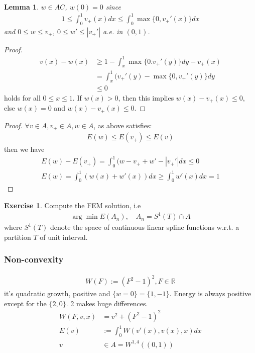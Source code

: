 \documentclass[a4paper,12pt,oneside,fleqn]{book}
\newtheorem{lemma}[theorem]{Lemma}
\theoremstyle{definition}
\newtheorem{exercise}{Exercise}[chapter]
\theoremstyle{remark}
\begin{document}
\quad\\
\begin{lemma}
	$w \in AC$, $w(0) = 0$ since
	\begin{align*}
		1 \le \int_0^1 v_+ (x) dx \le \int_0^1 \max\{0, v_+ '(x)\}dx
	\end{align*}
	and $0 \le w \le v_+ $, $0 \le w' \le |v_+'|$ a.e. in $(0, 1)$. 
\end{lemma}
\begin{proof}
\begin{align*}
	v(x) - w(x) &\ge 1- \int_x^1 \max \{0. v_+'(y)\}dy - v_+(x)\\
	&= \int_x^1 (v_+'(y) - \max\{0, v_+'(y)\}dy\\
	&\le 0
\end{align*}
holds for all $0 \le x \le 1$. If $w(x) >0$, then this implies $w(x) - v_+(x) \le 0$, else $w(x) = 0$ and $w(x) - v_+(x) \le 0$. 	
\end{proof}

\begin{proof}
	$\forall v \in A, v_+ \in A, w \in A$, as above satisfies:
	\begin{align*}
		E(w) \le E(v_+) \le E(v)
	\end{align*}
	then we have
	\begin{align*}
		E(w) - E(v_+) = \int_0^1 (w - v_+ + w' - |v_+'| dx \le 0\\
		E(w) = \int_0^1 (w(x) + w'(x) )dx \ge \int_0^1 w'(x)dx = 1
	\end{align*}
\end{proof}

\begin{exercise}
Compute the FEM solution, i.e 
\begin{align*}
	\arg\min E(A_n), \quad A_n = S^1(T) \cap A
\end{align*}
where $S^1(T)$ denote the space of continuous linear spline functions w.r.t. a partition $T$ of unit interval. 
\end{exercise}

\subsubsection{Non-convexity}
\begin{align*}
	W(F):= (F^2 -  1)^2 , F \in \mathbb{R}
\end{align*}
it's quadratic growth, positive and $\{w = 0\} = \{1, -1\}$. Energy is always positive except for the $\{2, 0\}$. 2 makes huge differences. 
\begin{align*}
	W(F, v, x) &= v^2 + (F^2 - 1)^2\\
	E(v) &:= \int_0^1 W(v'(x), v(x), x)dx\\ 
	v &\in A = W^{1, 4}((0, 1))
\end{align*}
\end{document}

